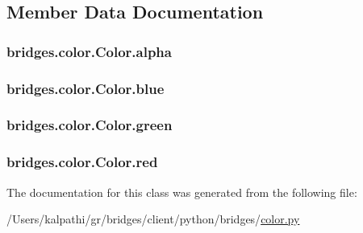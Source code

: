 \subsection{Member Data Documentation}
\hypertarget{classbridges_1_1color_1_1_color_a2e170f068eeb77ace0427d23b36f2b27}{}
\subsubsection[{alpha}]{\setlength{\rightskip}{0pt plus 5cm}bridges.\+color.\+Color.\+alpha}\label{classbridges_1_1color_1_1_color_a2e170f068eeb77ace0427d23b36f2b27}
\hypertarget{classbridges_1_1color_1_1_color_a2c5081c47a43419bb1c5dbbd9c72a21e}{}
\subsubsection[{blue}]{\setlength{\rightskip}{0pt plus 5cm}bridges.\+color.\+Color.\+blue}\label{classbridges_1_1color_1_1_color_a2c5081c47a43419bb1c5dbbd9c72a21e}
\hypertarget{classbridges_1_1color_1_1_color_a6f14b2d3ec82052c1aeb259ee687059d}{}
\subsubsection[{green}]{\setlength{\rightskip}{0pt plus 5cm}bridges.\+color.\+Color.\+green}\label{classbridges_1_1color_1_1_color_a6f14b2d3ec82052c1aeb259ee687059d}
\hypertarget{classbridges_1_1color_1_1_color_abb0aa417808af0140d3448a2e49d2d15}{}
\subsubsection[{red}]{\setlength{\rightskip}{0pt plus 5cm}bridges.\+color.\+Color.\+red}\label{classbridges_1_1color_1_1_color_abb0aa417808af0140d3448a2e49d2d15}


The documentation for this class was generated from the following file\+:\begin{DoxyCompactItemize}
\item 
/\+Users/kalpathi/gr/bridges/client/python/bridges/\hyperlink{color_8py}{color.\+py}\end{DoxyCompactItemize}
